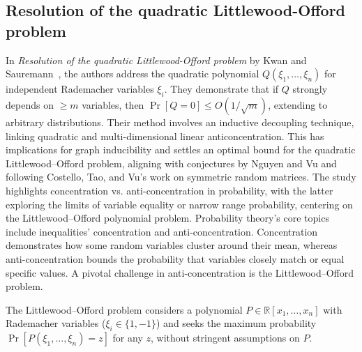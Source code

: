 \subsection{Resolution of the quadratic Littlewood-Offord problem}


In \textit{Resolution of the quadratic Littlewood-Offord problem} by Kwan and Sauremann~\cite{kwan2023resolution}, the authors address the quadratic polynomial $Q(\xi_1, \ldots, \xi_n)$ for independent Rademacher variables $\xi_i$. They demonstrate that if $Q$ strongly depends on $\geq m$ variables, then $\Pr[Q = 0] \leq O(1/\sqrt{m})$, extending to arbitrary distributions.
Their method involves an inductive decoupling technique, linking quadratic and multi-dimensional linear anticoncentration. This has implications for graph inducibility and settles an optimal bound for the quadratic Littlewood–Offord problem, aligning with conjectures by Nguyen and Vu and following Costello, Tao, and Vu's work on symmetric random matrices.
The study highlights concentration vs. anti-concentration in probability, with the latter exploring the limits of variable equality or narrow range probability, centering on the Littlewood–Offord polynomial problem.
Probability theory's core topics include inequalities' concentration and anti-concentration. Concentration demonstrates how some random variables cluster around their mean, whereas anti-concentration bounds the probability that variables closely match or equal specific values. A pivotal challenge in anti-concentration is the Littlewood–Offord problem.

The Littlewood–Offord problem considers a polynomial $P \in \mathbb{R}[x_1,\ldots,x_n]$ with Rademacher variables ($\xi_i \in \{1,-1\}$) and seeks the maximum probability $\Pr[P(\xi_1,\ldots,\xi_n) = z]$ for any $z$, without stringent assumptions on $P$.

